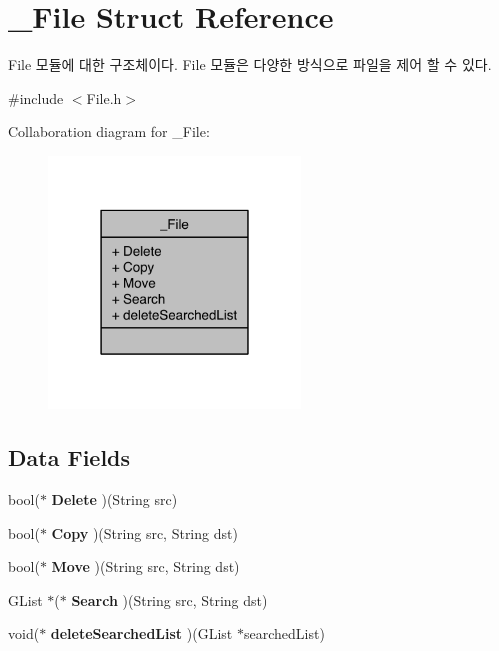 \hypertarget{struct__File}{\section{\-\_\-\-File Struct Reference}
\label{struct__File}
}


File 모듈에 대한 구조체이다. File 모듈은 다양한 방식으로 파일을 제어 할 수 있다.  




{\ttfamily \#include $<$File.\-h$>$}



Collaboration diagram for \-\_\-\-File\-:\nopagebreak
\begin{figure}[H]
\begin{center}
\leavevmode
\includegraphics[width=190pt]{da/dea/struct__File__coll__graph}
\end{center}
\end{figure}
\subsection*{Data Fields}
\begin{DoxyCompactItemize}
\item 
\hypertarget{struct__File_a8a0c0c350e721abac784f1225a6c2377}{bool($\ast$ {\bfseries Delete} )(String src)}\label{struct__File_a8a0c0c350e721abac784f1225a6c2377}

\item 
\hypertarget{struct__File_ad747f9e0fbb366ff1b1268790bcc16f5}{bool($\ast$ {\bfseries Copy} )(String src, String dst)}\label{struct__File_ad747f9e0fbb366ff1b1268790bcc16f5}

\item 
\hypertarget{struct__File_ab0acd7a656b5003793caa7ad2914d050}{bool($\ast$ {\bfseries Move} )(String src, String dst)}\label{struct__File_ab0acd7a656b5003793caa7ad2914d050}

\item 
\hypertarget{struct__File_a4372eaf72ad5ad415c0dc75a3420e1bb}{G\-List $\ast$($\ast$ {\bfseries Search} )(String src, String dst)}\label{struct__File_a4372eaf72ad5ad415c0dc75a3420e1bb}

\item 
\hypertarget{struct__File_a688001b808e44b036dac30773decb791}{void($\ast$ {\bfseries delete\-Searched\-List} )(G\-List $\ast$searched\-List)}\label{struct__File_a688001b808e44b036dac30773decb791}

\end{DoxyCompactItemize}


